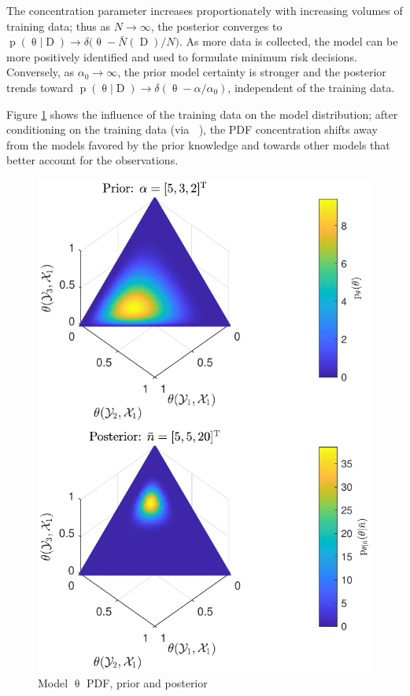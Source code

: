 \documentclass[conference]{IEEEtran}
\DeclareMathOperator{\Drm}{\mathrm{D}}
\DeclareMathOperator{\nbarrm}{\bar{\mathrm{n}}}
\DeclareMathOperator{\prm}{\mathrm{p}}
\begin{document}
The concentration parameter increases proportionately with increasing volumes of training data; thus as $N \to \infty$, the posterior converges to $\prm(\uptheta | \Drm) \to \delta\big( \uptheta - \bar{N}(\Drm) / N \big)$. As more data is collected, the model can be more positively identified and used to formulate minimum risk decisions. Conversely, as $\alpha_0 \to \infty$, the prior model certainty is stronger and the posterior trends toward $\prm(\uptheta | \Drm) \to \delta( \uptheta - \alpha / \alpha_0)$, independent of the training data.

Figure \ref{fig:P_theta_D} shows the influence of the training data on the model distribution; after conditioning on the training data (via $\nbarrm$), the PDF concentration shifts away from the models favored by the prior knowledge and towards other models that better account for the observations.

\begin{figure}
\centering
\includegraphics[width=1\linewidth]{P_theta_post.pdf}
\caption{Model $\uptheta$ PDF, prior and posterior}
\label{fig:P_theta_D}
\end{figure}
\end{document}
